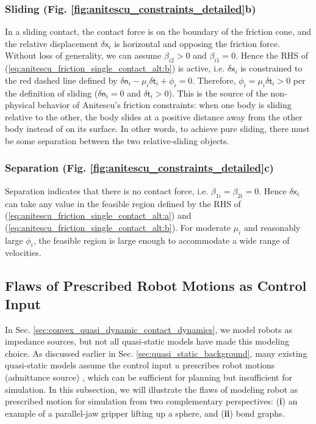 \subsubsection{Sliding (Fig. \ref{fig:anitescu_constraints_detailed}b) \label{section:anitescu_friction_sliding}} In a sliding contact, the contact force is on the boundary of the friction cone, and the relative displacement $\delta \mathsf{x}_i$ is horizontal and opposing the friction force. Without loss of generality, we can assume $\beta_{i2}>0$ and $\beta_{i1} = 0$. Hence the RHS of (\ref{eq:anitescu_friction_single_contact_alt:b}) is active, i.e. $\delta \mathsf{x}_i$ is constrained to the red dashed line defined by $ \delta \mathsf{n}_i - \mu_i \delta \mathsf{t}_i + \phi_i = 0$. 
Therefore, $\phi_i = \mu_i \delta \mathsf{t}_i > 0$ per the definition of sliding ($\delta \mathsf{n}_i = 0$ and $\delta \mathsf{t}_i > 0$).
This is the source of the non-physical behavior of Anitescu's friction constraints: when one body is sliding relative to the other, the body slides at a positive distance away from the other body instead of on its surface. In other words, to achieve pure sliding, there must be some separation between the two relative-sliding objects.

\subsubsection{Separation (Fig. \ref{fig:anitescu_constraints_detailed}c)} Separation indicates that there is no contact force, i.e. $\beta_{1i} = \beta_{2i} = 0$. Hence $\delta \mathsf{x}_i$ can take any value in the feasible region defined by the RHS of (\ref{eq:anitescu_friction_single_contact_alt:a}) and (\ref{eq:anitescu_friction_single_contact_alt:b}). For moderate $\mu_i$ and reasonably large $\phi_i$, the feasible region is large enough to accommodate a wide range of velocities.


\subsection{Flaws of Prescribed Robot Motions as Control Input} \label{sec:quasi_static:prescribed_motion_bad}
In Sec. \ref{sec:convex_quasi_dynamic_contact_dynamics}, we model robots as impedance sources, but not all quasi-static models have made this modeling choice. As discussed earlier in Sec. \ref{sec:quasi_static_background}, many existing quasi-static models assume the control input $u$ prescribes robot motions (admittance source) \cite{mason1986mechanics, lynch1996stable, zhou2017fast, hogan2020feedback}, which can be sufficient for planning but insufficient for simulation.
In this subsection, we will illustrate the flaws of modeling robot as prescribed motion for simulation from two complementary perspectives: (\textbf{i}) an example of a parallel-jaw gripper lifting up a sphere, and (\textbf{ii}) bond graphs.

